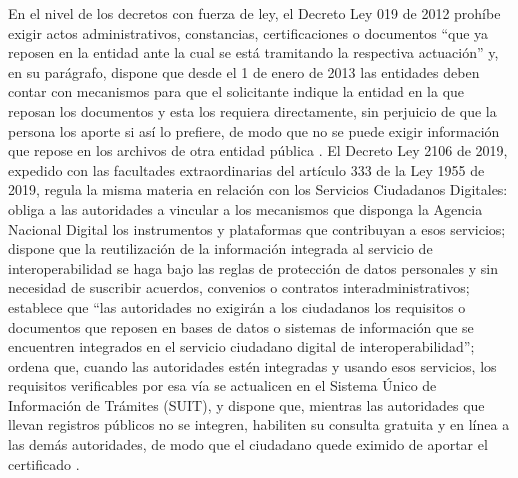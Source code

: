 En el nivel de los decretos con fuerza de ley, el Decreto Ley 019 de 2012 prohíbe exigir actos administrativos, constancias, certificaciones o documentos \enquote{que ya reposen en la entidad ante la cual se está tramitando la respectiva actuación} y, en su parágrafo, dispone que desde el 1 de enero de 2013 las entidades deben contar con mecanismos para que el solicitante indique la entidad en la que reposan los documentos y esta los requiera directamente, sin perjuicio de que la persona los aporte si así lo prefiere, de modo que no se puede exigir información que repose en los archivos de otra entidad pública \parencite[art.~9]{colombia2012decreto019}. El Decreto Ley 2106 de 2019, expedido con las facultades extraordinarias del artículo 333 de la Ley 1955 de 2019, regula la misma materia en relación con los Servicios Ciudadanos Digitales: obliga a las autoridades a vincular a los mecanismos que disponga la Agencia Nacional Digital los instrumentos y plataformas que contribuyan a esos servicios; dispone que la reutilización de la información integrada al servicio de interoperabilidad se haga bajo las reglas de protección de datos personales y sin necesidad de suscribir acuerdos, convenios o contratos interadministrativos; establece que \enquote{las autoridades no exigirán a los ciudadanos los requisitos o documentos que reposen en bases de datos o sistemas de información que se encuentren integrados en el servicio ciudadano digital de interoperabilidad}; ordena que, cuando las autoridades estén integradas y usando esos servicios, los requisitos verificables por esa vía se actualicen en el Sistema Único de Información de Trámites (SUIT), y dispone que, mientras las autoridades que llevan registros públicos no se integren, habiliten su consulta gratuita y en línea a las demás autoridades, de modo que el ciudadano quede eximido de aportar el certificado \parencite[art.~10]{colombia2019decreto2106}.

